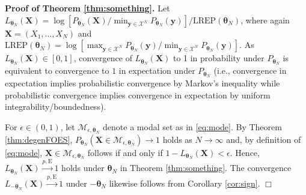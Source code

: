 \documentclass[numbib]{imamat}
\theoremstyle{theorem}
\theoremstyle{lemma}
\theoremstyle{example}
\theoremstyle{corollary}
\theoremstyle{definition}
\theoremstyle{remark}
\theoremstyle{approximation}
\theoremstyle{scheme}
\newcommand{\REP}{\mathrm{LREP}}
\begin{document}
\textbf{Proof of Theorem \ref{thm:something}.} Let \(L_{\boldsymbol \theta_{N}}(\boldsymbol X) = \log[ P_{\boldsymbol \theta_{N}}(\boldsymbol X)/ \min_{\boldsymbol y \in \mathcal{X}^N} P_{\boldsymbol \theta_{N}}(\boldsymbol y) ]/\REP(\boldsymbol \theta_{N})\), where again \(\boldsymbol X=(X_1, \dots, X_N)\) and \(\REP(\boldsymbol \theta_{N})= \log[\max_{\boldsymbol y \in \mathcal{X}^N} P_{\boldsymbol \theta_{N}}(\boldsymbol y)/ \min_{\boldsymbol y \in \mathcal{X}^N} P_{\boldsymbol \theta_{N}}(\boldsymbol y) ]\). As \(L_{\boldsymbol \theta_{N}}(\boldsymbol X)\in[0,1]\), convergence of \(L_{\boldsymbol \theta_{N}}(\boldsymbol X)\) to 1 in probability under \(P_{\boldsymbol \theta_{N}}\) is equivalent to convergence to \(1\) in expectation under \(P_{\boldsymbol \theta_{N}}\) (i.e., convergence in expectation implies probabilistic convergence by Markov's inequality while probabilistic convergence implies convergence in expectation by uniform integrability/boundedness).

For \(\epsilon \in(0,1)\), let \(\mathcal{M}_{\epsilon, \boldsymbol \theta_N}\) denote a modal set as in \eqref{eq:mode}. By Theorem \ref{thm:degenFOES}, \(P_{\boldsymbol \theta_N}\left( \boldsymbol X\in \mathcal{M}_{\epsilon, \boldsymbol \theta_N}\right) \rightarrow 1\) holds as \(N \rightarrow \infty\) and, by definition of \eqref{eq:mode}, \(\boldsymbol X\in \mathcal{M}_{\epsilon, \boldsymbol \theta_N}\) follows if and only if
\(1-L_{\boldsymbol \theta_{N}}(\boldsymbol X)<\epsilon\). Hence, \(L_{\boldsymbol \theta_{N}}(\boldsymbol X) \stackrel{p,\mathrm{E}}{\longrightarrow} 1\) holds under \(\boldsymbol \theta_{N}\) in Theorem \ref{thm:something}. The convergence \(L_{-\boldsymbol \theta_{N}}(\boldsymbol X) \stackrel{p,\mathrm{E}}{\longrightarrow} 1\) under \(-\boldsymbol \theta_{N}\) likewise follows from Corollary \ref{cor:sign}. \hfill \(\Box\)

\clearpage




\end{document}
